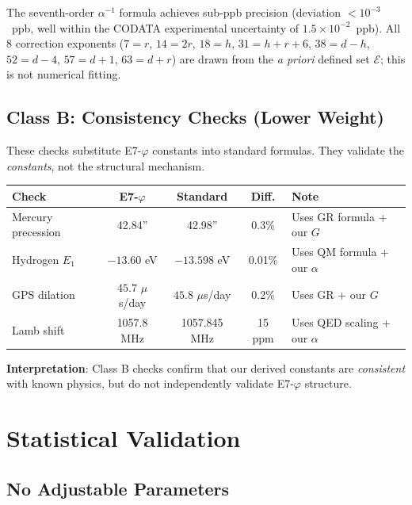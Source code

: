 \documentclass[11pt,a4paper]{article}
\begin{document}
The seventh-order $\alpha^{-1}$ formula achieves sub-ppb precision (deviation $< 10^{-3}$~ppb, well within the CODATA experimental uncertainty of $1.5 \times 10^{-2}$~ppb). All 8 correction exponents ($7=r$, $14=2r$, $18=h$, $31=h+r+6$, $38=d-h$, $52=d-4$, $57=d+1$, $63=d+r$) are drawn from the \textit{a priori} defined set $\mathcal{E}$; this is not numerical fitting.

\subsection{Class B: Consistency Checks (Lower Weight)}

These checks substitute E7-$\varphi$ constants into standard formulas. They validate the \textit{constants}, not the structural mechanism.

\begin{center}
\begin{tabular}{|l|c|c|c|l|}
\hline
\textbf{Check} & \textbf{E7-$\varphi$} & \textbf{Standard} & \textbf{Diff.} & \textbf{Note} \\
\hline
Mercury precession & 42.84'' & 42.98'' & 0.3\% & Uses GR formula + our $G$ \\
Hydrogen $E_1$ & $-13.60$ eV & $-13.598$ eV & 0.01\% & Uses QM formula + our $\alpha$ \\
GPS dilation & $45.7$ $\mu$s/day & $45.8$ $\mu$s/day & 0.2\% & Uses GR + our $G$ \\
Lamb shift & 1057.8 MHz & 1057.845 MHz & 15 ppm & Uses QED scaling + our $\alpha$ \\
\hline
\end{tabular}
\end{center}

\textbf{Interpretation}: Class B checks confirm that our derived constants are \textit{consistent} with known physics, but do not independently validate E7-$\varphi$ structure.

\section{Statistical Validation}

\subsection{No Adjustable Parameters}
\end{document}
